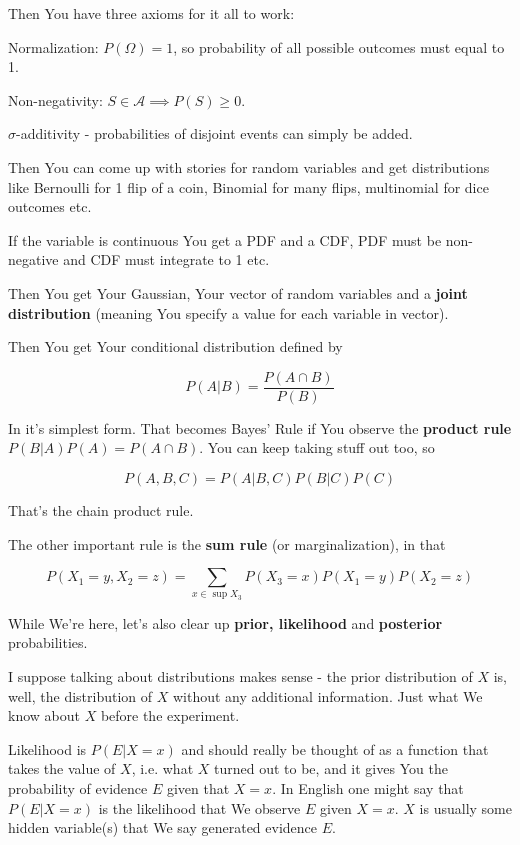 \documentclass{article}
\begin{document}
		Then You have three axioms for it all to work:
		
		Normalization: $P(\Omega) = 1$, so probability of all possible outcomes must equal to 1.
		
		Non-negativity: $S\in\mathcal{A}\implies P(S)\ge 0$.
		
		$\sigma$-additivity - probabilities of disjoint events can simply be added.
		
		Then You can come up with stories for random variables and get distributions like Bernoulli for 1 flip of a coin, Binomial for many flips, multinomial for dice outcomes etc.
		
		If the variable is continuous You get a PDF and a CDF, PDF must be non-negative and CDF must integrate to 1 etc.
		
		Then You get Your Gaussian, Your vector of random variables and a \textbf{joint distribution} (meaning You specify a value for each variable in vector).
		
		Then You get Your conditional distribution defined by
		
		\[ P(A|B) = \frac{P(A\cap B)}{P(B)} \]
		
		In it's simplest form. That becomes Bayes' Rule if You observe the \textbf{product rule} $P(B|A)P(A) = P(A\cap B)$. You can keep taking stuff out too, so
		
		\[ P(A, B, C) = P(A|B, C)P(B|C)P(C) \]
		
		That's the chain product rule. 
		
		The other important rule is the \textbf{sum rule} (or marginalization), in that
		
		\[ P(X_1=y, X_2=z) = \sum_{x\in\sup{X_3}} P(X_3=x) P(X_1=y)P(X_2=z)\]
		
		While We're here, let's also clear up \textbf{prior, likelihood} and \textbf{posterior} probabilities.
		
		I suppose talking about distributions makes sense - the prior distribution of $X$ is, well, the distribution of $X$ without any additional information. Just what We know about $X$ before the experiment.
		
		Likelihood is $P(E|X=x)$ and should really be thought of as a function that takes the value of $X$, i.e. what $X$ turned out to be, and it gives You the probability of evidence $E$ given that $X=x$. In English one might say that $P(E|X=x)$ is the likelihood that We observe $E$ given $X=x$. $X$ is usually some hidden variable(s) that We say generated evidence $E$.
		
\end{document}
